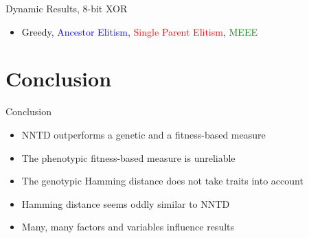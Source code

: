 \begin{frame}[t]{Dynamic Results, 8-bit XOR}
  \begin{itemize}
    \item \textcolor{black}{Greedy}, \textcolor{blue}{Ancestor Elitism}, \textcolor{red}{Single Parent Elitism}, \textcolor{green}{MEEE}
  \end{itemize}


\end{frame}

\section{Conclusion}
\begin{frame}{Conclusion}
  \begin{itemize}
    \item NNTD outperforms a genetic and a fitness-based measure
    \item The phenotypic fitness-based measure is unreliable
    \item The genotypic Hamming distance does not take traits into account
    \item Hamming distance seems oddly similar to NNTD
    \item Many, many factors and variables influence results
  \end{itemize}
\end{frame}

